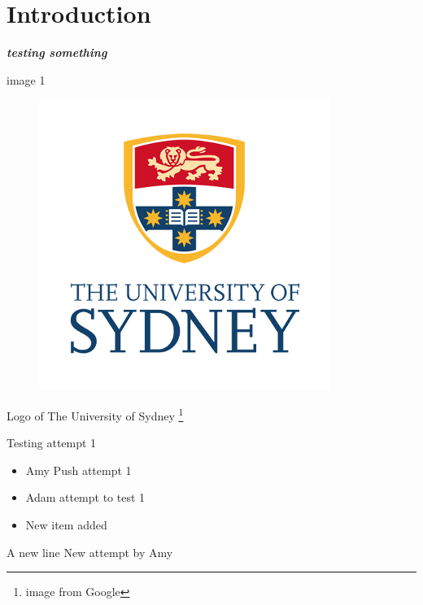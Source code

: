 \documentclass[10pt]{article}
\newcommand{\boldit}[1]{\textbf{\textit{#1}}}
\begin{document}
\section{\textsf{Introduction}}
\boldit{testing something}

image 1 
\begin{figure}[hbt!]
  \centering
  \includegraphics{usyd logo}
\end{figure}
Logo of The University of Sydney \footnote{image from Google}

Testing attempt 1
\begin{itemize}
  \item Amy Push attempt 1
  \item Adam attempt to test 1
  \item New item added
\end{itemize}

A new line
New attempt by Amy
\end{document}
